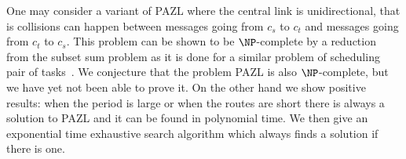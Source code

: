 \documentclass[10pt, conference, letterpaper]{IEEEtran}
\begin{document}
    One may consider a variant of PAZL where the central link is unidirectional, that is collisions can happen between messages going from $c_s$ to $c_t$ and messages  going from $c_t$ to $c_s$. This problem can be shown to be $\NP$-complete by a reduction from the subset sum problem as it is done for a similar problem of scheduling pair of tasks~\cite{orman1997complexity}. We conjecture that the problem PAZL is also $\NP$-complete,  but we have yet not been able to prove it.
  On the other hand we show positive results:  when the period is large or when the routes are short there is always a solution to PAZL and it can be found in polynomial time. We then give an exponential time exhaustive search algorithm which always finds a solution if there is one. 
  
  
  
%
\end{document}
